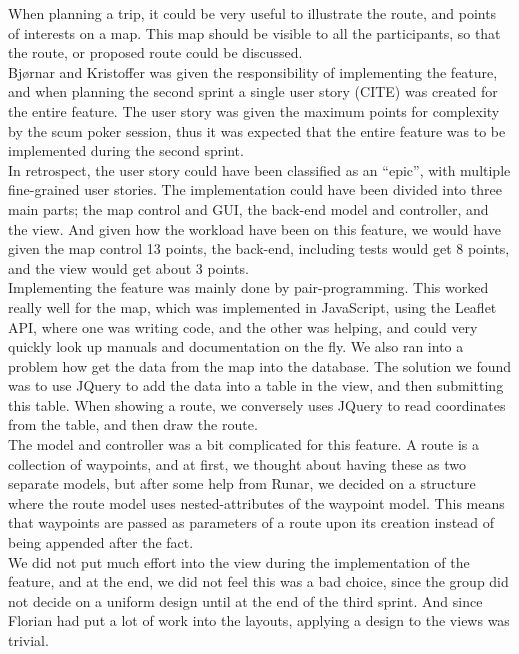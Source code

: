 \documentclass[a4paper]{article}
\begin{document}
\noindent
When planning a trip, it could be very useful to illustrate the route, and points of interests on a map. This map should be visible to all the participants, so that the route, or proposed route could be discussed.\\

\noindent
Bjørnar and Kristoffer was given the responsibility of implementing the feature, and when planning the second sprint a single user story (CITE) was created for the entire feature. The user story was given the maximum points for complexity by the scum poker session, thus it was expected that the entire feature was to be implemented during the second sprint. \\

\noindent
In retrospect, the user story could have been classified as an “epic”, with multiple fine-grained user stories. The implementation could have been divided into three main parts; the map control and GUI, the back-end model and controller, and the view. And given how the workload have been on this feature, we would have given the map control 13 points, the back-end, including tests would get 8 points, and the view would get about 3 points. \\

\noindent
Implementing the feature was mainly done by pair-programming. This worked really well for the map, which was implemented in JavaScript, using the Leaflet API, where one was writing code, and the other was helping, and could very quickly look up manuals and documentation on the fly. We also ran into a problem how get the data from the map into the database. The solution we found was to use JQuery to add the data into a table in the view, and then submitting this table. When showing a route, we conversely uses JQuery to read coordinates from the table, and then draw the route.  \\

\noindent
The model and controller was a bit complicated for this feature. A route is a collection of waypoints, and at first, we thought about having these as two separate models, but after some help from Runar, we decided on a structure where the route model uses nested-attributes of the waypoint model. This means that waypoints are passed as parameters of a route upon its creation instead of being appended after the fact. \\

\noindent
We did not put much effort into the view during the implementation of the feature, and at the end, we did not feel this was a bad choice, since the group did not decide on a uniform design until at the end of the third sprint. And since Florian had put a lot of work into the layouts, applying a design to the views was trivial. \\
\end{document}
